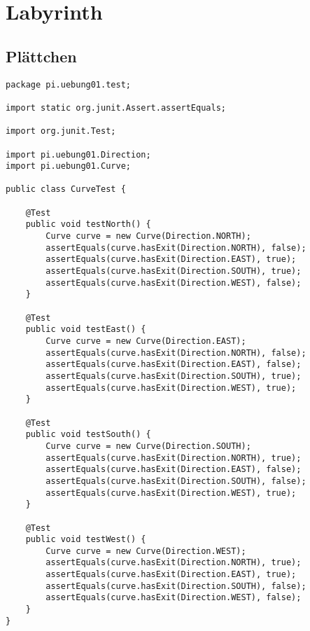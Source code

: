 \documentclass{pi2}
\begin{document}
\section{Labyrinth}

\subsection{Plättchen}

\begin{lstlisting}
package pi.uebung01.test;

import static org.junit.Assert.assertEquals;

import org.junit.Test;

import pi.uebung01.Direction;
import pi.uebung01.Curve;

public class CurveTest {

	@Test
	public void testNorth() {
		Curve curve = new Curve(Direction.NORTH);
		assertEquals(curve.hasExit(Direction.NORTH), false);
		assertEquals(curve.hasExit(Direction.EAST), true);
		assertEquals(curve.hasExit(Direction.SOUTH), true);
		assertEquals(curve.hasExit(Direction.WEST), false);
	}
	
	@Test
	public void testEast() {
		Curve curve = new Curve(Direction.EAST);
		assertEquals(curve.hasExit(Direction.NORTH), false);
		assertEquals(curve.hasExit(Direction.EAST), false);
		assertEquals(curve.hasExit(Direction.SOUTH), true);
		assertEquals(curve.hasExit(Direction.WEST), true);
	}
	
	@Test
	public void testSouth() {
		Curve curve = new Curve(Direction.SOUTH);
		assertEquals(curve.hasExit(Direction.NORTH), true);
		assertEquals(curve.hasExit(Direction.EAST), false);
		assertEquals(curve.hasExit(Direction.SOUTH), false);
		assertEquals(curve.hasExit(Direction.WEST), true);
	}
	
	@Test
	public void testWest() {
		Curve curve = new Curve(Direction.WEST);
		assertEquals(curve.hasExit(Direction.NORTH), true);
		assertEquals(curve.hasExit(Direction.EAST), true);
		assertEquals(curve.hasExit(Direction.SOUTH), false);
		assertEquals(curve.hasExit(Direction.WEST), false);
	}
}

\end{lstlisting}
\end{document}
